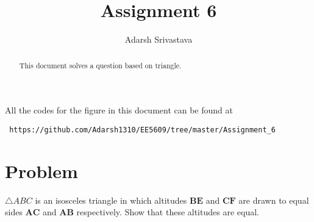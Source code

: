\documentclass[journal,12pt,twocolumn]{IEEEtran}
\begin{document}
 \makeatletter
 \makeatother
 \let\StandardTheFigure\thefigure
 \let\vec\mathbf
 \renewcommand{\thefigure}{\theproblem}
 \def\putbox#1#2#3{\makebox[0in][l]{\makebox[#1][l]{}\raisebox{\baselineskip}[0in][0in]{\raisebox{#2}[0in][0in]{#3}}}}
      \def\rightbox#1{\makebox[0in][r]{#1}}
      \def\centbox#1{\makebox[0in]{#1}}
      \def\topbox#1{\raisebox{-\baselineskip}[0in][0in]{#1}}
      \def\midbox#1{\raisebox{-0.5\baselineskip}[0in][0in]{#1}}
 \vspace{3cm}
 \title{Assignment 6}
 \author{Adarsh Srivastava}
 \maketitle
 \newpage
 \bigskip
 \renewcommand{\thefigure}{\theenumi}
 \renewcommand{\thetable}{\theenumi}
 \begin{abstract}
 This document solves a question based on triangle.
 \end{abstract}
 All the codes for the figure in this document can be found at
 \begin{lstlisting}
 https://github.com/Adarsh1310/EE5609/tree/master/Assignment_6
 \end{lstlisting}
 \section{Problem}
 $\triangle{ABC}$ is an isosceles triangle in which altitudes $\vec{BE}$ and $\vec{CF}$ are drawn to equal sides $\vec{AC}$ and $\vec{AB}$ respectively. Show that these altitudes are equal.
\end{document}
